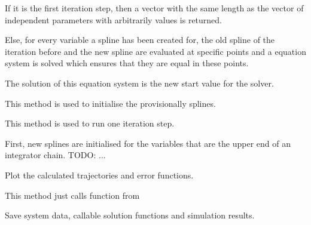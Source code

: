 \documentclass[letterpaper,10pt,english]{sphinxmanual}
\begin{document}
\begin{fulllineitems}
\begin{fulllineitems}
If it is the first iteration step, then a vector with the same length as the vector of
independent parameters with arbitrarily values is returned.

Else, for every variable a spline has been created for, the old spline of the iteration
before and the new spline are evaluated at specific points and a equation system
is solved which ensures that they are equal in these points.

The solution of this equation system is the new start value for the solver.

\end{fulllineitems}


\begin{fulllineitems}
\label{pytrajectory:pytrajectory.trajectory.Trajectory.initSplines}
This method is used to initialise the provisionally splines.

\end{fulllineitems}


\begin{fulllineitems}
\label{pytrajectory:pytrajectory.trajectory.Trajectory.iterate}
This method is used to run one iteration step.

First, new splines are initialised for the variables that are the upper end of an
integrator chain.
TODO: ...

\end{fulllineitems}


\begin{fulllineitems}
\label{pytrajectory:pytrajectory.trajectory.Trajectory.plot}
Plot the calculated trajectories and error functions.

This method just calls {\hyperref[pytrajectory:pytrajectory.trajectory.Trajectory.plot]{}} function from 

\end{fulllineitems}


\begin{fulllineitems}
\label{pytrajectory:pytrajectory.trajectory.Trajectory.save}
Save system data, callable solution functions and simulation results.


\end{fulllineitems}
\end{fulllineitems}
\end{document}
